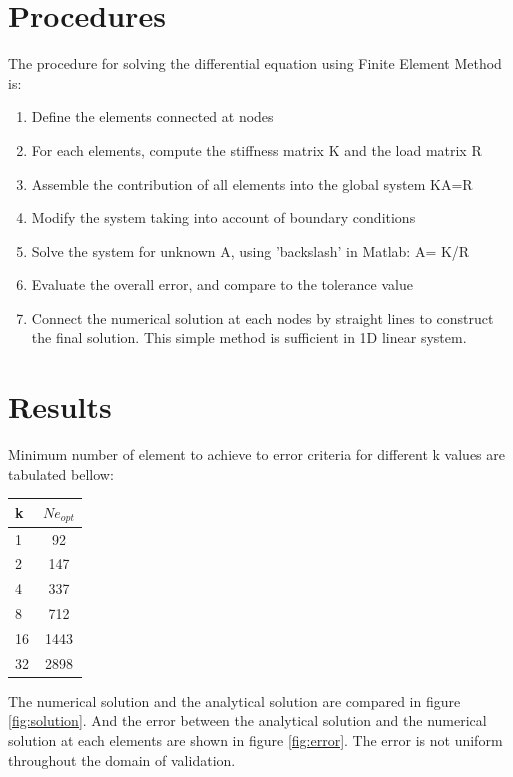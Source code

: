 \documentclass[paper=a4, fontsize=11pt]{article} %
\begin{document}
\section{Procedures}

The procedure for solving the differential equation using Finite Element Method is:

\begin{enumerate}
\item Define the elements connected at nodes

\item For each elements, compute the stiffness matrix K and the load matrix R

\item Assemble the contribution of all elements into the global system KA=R

\item  Modify the system taking into account of boundary conditions

\item Solve the system for unknown A, using 'backslash' in Matlab: A= K/R

\item  Evaluate the overall error, and compare to the tolerance value

\item Connect the numerical solution at each nodes by straight lines to construct the final solution. This simple method is sufficient in 1D linear system. 


\end{enumerate}


\section{Results}

Minimum number of element to achieve to error criteria for different k values are tabulated bellow: 

\begin{center}
  \begin{tabular}{ l | c}
    \hline
    k & $Ne_{opt}$\\ \hline
    1 & 92\\ \hline
    2 & 147 \\ \hline
    4 & 337 \\ \hline
    8 & 712 \\ \hline
    16 & 1443 \\ \hline
    32 & 2898 \\ \hline
    \hline
  \end{tabular}
\end{center}
The numerical solution and the analytical solution are compared in figure \ref{fig:solution}. And the error between the analytical solution and the numerical solution at each elements are shown in figure \ref{fig:error}. The error is not uniform throughout the domain of validation. 
\end{document}
